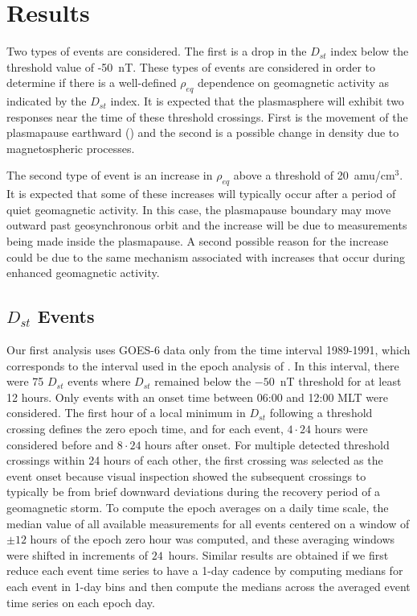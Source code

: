 \documentclass[12pt]{article}
\begin{document}
\section{Results}

Two types of events are considered. The first is a drop in the $D_{st}$ index below the threshold value of -50~nT. These types of events are considered in order to determine if there is a well-defined $\rho_{eq}$ dependence on geomagnetic activity as indicated by the $D_{st}$ index.  It is expected that the plasmasphere will exhibit two responses near the time of these threshold crossings.  First is the movement of the plasmapause earthward (\cite{LemaireEarthsPlasmasphere}) and the second is a possible change in density due to magnetospheric processes. 

The second type of event is an increase in $\rho_{eq}$ above a threshold of 20~amu/cm$^3$.  It is expected that some of these increases will typically occur after a period of quiet geomagnetic activity.  In this case, the plasmapause boundary may move outward past geosynchronous orbit and the increase will be due to measurements being made inside the plasmapause.  A second possible reason for the increase could be due to the same mechanism associated with increases that occur during enhanced geomagnetic activity.

\subsection{$D_{st}$ Events}

Our first analysis uses GOES-6 data only from the time interval 1989-1991, which corresponds to the interval used in the epoch analysis of \cite{Takahashi2010}. In this interval, there were 75 $D_{st}$ events where $D_{st}$ remained below the $-50$~nT threshold for at least 12 hours. Only events with an onset time between 06:00 and 12:00 MLT were considered. The first hour of a local minimum in $D_{st}$ following a threshold crossing defines the zero epoch time, and for each event, $4\cdot24$ hours were considered before and $8\cdot24$ hours after onset. For multiple detected threshold crossings within 24 hours of each other, the first crossing was selected as the event onset because visual inspection showed the subsequent crossings to typically be from brief downward deviations during the recovery period of a geomagnetic storm. To compute the epoch averages on a daily time scale, the median value of all available measurements for all events centered on a window of $\pm 12$ hours of the epoch zero hour was computed, and these averaging windows were shifted in increments of $24$~hours. Similar results are obtained if we first reduce each event time series to have a 1-day cadence by computing medians for each event in 1-day bins and then compute the medians across the averaged event time series on each epoch day. 
\end{document}
